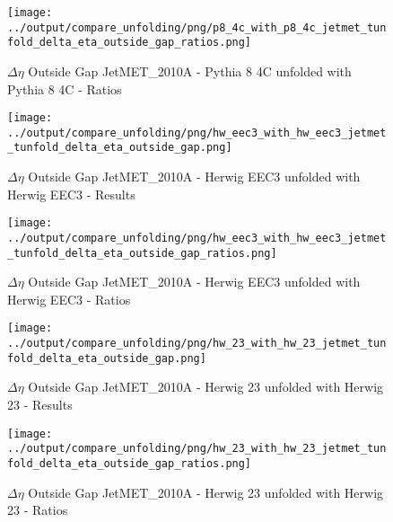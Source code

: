 \documentclass[11pt]{book}
\begin{document}
\begin{figure}[ht]
\centering
\texttt{[image: ../output/compare\_unfolding/png/p8\_4c\_with\_p8\_4c\_jetmet\_tunfold\_delta\_eta\_outside\_gap\_ratios.png]}
\caption{$\Delta\eta$ Outside Gap JetMET\_2010A - Pythia 8 4C unfolded with Pythia 8 4C - Ratios}
\label{p8_p8_jetmet_tunfold_delta_eta_outside_gap_b}
\end{figure}

\begin{figure}[ht]
\centering
\texttt{[image: ../output/compare\_unfolding/png/hw\_eec3\_with\_hw\_eec3\_jetmet\_tunfold\_delta\_eta\_outside\_gap.png]}
\caption{$\Delta\eta$ Outside Gap JetMET\_2010A - Herwig EEC3 unfolded with Herwig EEC3 - Results}
\label{hw_eec3_hw_eec3_jetmet_tunfold_delta_eta_outside_gap_a}
\end{figure}

\begin{figure}[ht]
\centering
\texttt{[image: ../output/compare\_unfolding/png/hw\_eec3\_with\_hw\_eec3\_jetmet\_tunfold\_delta\_eta\_outside\_gap\_ratios.png]}
\caption{$\Delta\eta$ Outside Gap JetMET\_2010A - Herwig EEC3 unfolded with Herwig EEC3 - Ratios}
\label{hw_eec3_hw_eec3_jetmet_tunfold_delta_eta_outside_gap_b}
\end{figure}

\begin{figure}[ht]
\centering
\texttt{[image: ../output/compare\_unfolding/png/hw\_23\_with\_hw\_23\_jetmet\_tunfold\_delta\_eta\_outside\_gap.png]}
\caption{$\Delta\eta$ Outside Gap JetMET\_2010A - Herwig 23 unfolded with Herwig 23 - Results}
\label{hw_23_hw_23_jetmet_tunfold_delta_eta_outside_gap_a}
\end{figure}

\begin{figure}[ht]
\centering
\texttt{[image: ../output/compare\_unfolding/png/hw\_23\_with\_hw\_23\_jetmet\_tunfold\_delta\_eta\_outside\_gap\_ratios.png]}
\caption{$\Delta\eta$ Outside Gap JetMET\_2010A - Herwig 23 unfolded with Herwig 23 - Ratios}
\label{hw_23_hw_23_jetmet_tunfold_delta_eta_outside_gap_b}
\end{figure}




\listoffigures

 
\end{document}
